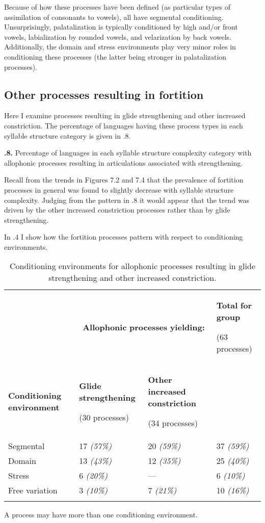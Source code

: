   Because of how these processes have been defined (as particular types of assimilation of consonants to vowels), all have segmental conditioning. Unsurprisingly, palatalization is typically conditioned by high and/or front vowels, labialization by rounded vowels, and velarization by back vowels. Additionally, the domain and stress environments play very minor roles in conditioning these processes (the latter being stronger in palatalization processes).

\subsection{Other processes resulting in fortition}\label{sec:7.3.4}

  Here I examine processes resulting in glide strengthening and other increased constriction. The percentage of languages having these process types in each syllable structure category is given in .8.

\textbf{.8.} Percentage of languages in each syllable structure complexity category with allophonic processes resulting in articulations associated with strengthening.

  Recall from the trends in Figures 7.2 and 7.4 that the prevalence of fortition processes in general was found to slightly decrease with syllable structure complexity. Judging from the pattern in .8 it would appear that the trend was driven by the other increased constriction processes rather than by glide strengthening.

  In .4 I show how the fortition processes pattern with respect to conditioning environments.

\begin{table}
\begin{tabularx}{\textwidth}{XXXX}
\lsptoprule
 & \multicolumn{2}{c}{ \textbf{Allophonic} \textbf{processes} \textbf{yielding:}} & { \textbf{Total} \textbf{for} \textbf{group}}

 (63 processes)\\
 \textbf{Conditioning} \textbf{environment} & { \textbf{Glide} \textbf{strengthening}}

 (30 processes) & { \textbf{Other} \textbf{increased} \textbf{constriction}}

 (34 processes) & \\
 Segmental & 17 \textit{(57\%)} & 20 \textit{(59\%)} & 37 \textit{(59\%)}\\
 Domain & 13 \textit{(43\%)} & 12 \textit{(35\%)} & 25 \textit{(40\%)}\\
 Stress & 6 \textit{(20\%)} & — & 6 \textit{(10\%)}\\
 Free variation & 3 \textit{(10\%)} & 7 \textit{(21\%)} & 10 \textit{(16\%)}\\
\lspbottomrule
\end{tabularx}
\caption{\label{7.4}Conditioning environments for allophonic processes resulting in glide strengthening and other increased constriction.}A process may have more than one conditioning environment.
\end{table}

